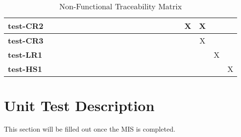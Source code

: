 \documentclass[12pt, titlepage]{article}
\begin{document}
\begin{landscape}
\begin{table}[H]
\begin{adjustwidth}{-0.3in}{-0.5in}
{\begin{tabular}{c|c|c|c|c|c|c|c|c|c|c|c|c|c|c|c|c|c|c|c|c|c|}
\multicolumn{1}{|l|}{\textbf{test-CR2}}   &             &             &             &             &             &              &             &             &              &              &              &             &              &             &             &         &&X&X&&     \\ \hline
\multicolumn{1}{|l|}{\textbf{test-CR3}}   &             &             &             &             &             &              &             &             &              &              &              &             &              &             &             &         &&&X&&     \\ \hline
\multicolumn{1}{|l|}{\textbf{test-LR1}}   &             &             &             &             &             &              &             &             &              &              &              &             &              &             &             &         &&&&X&     \\ \hline
\multicolumn{1}{|l|}{\textbf{test-HS1}}   &             &             &             &             &             &              &             &             &              &              &              &             &              &             &             &         &&&&& X    \\ \hline


\end{tabular}

}
\caption{Non-Functional Traceability Matrix}
    \label{tab:matrix3}
\end{adjustwidth}
\end{table}
\end{landscape}

\section{Unit Test Description}
This section will be filled out once the MIS is completed. 


\end{document}
